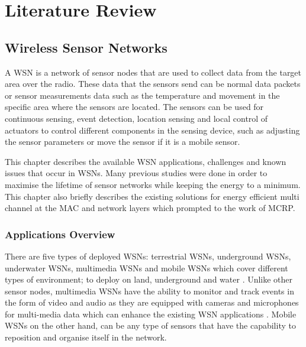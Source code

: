 \chapter{Literature Review}
\label{literatureReview}

\section{Wireless Sensor Networks}
A WSN is a network of sensor nodes that are used to collect data from the target area over the radio. These data that the sensors send can be normal data packets or sensor measurements data such as the temperature and movement in the specific area where the sensors are located. The sensors can be used for continuous sensing, event detection, location sensing and local control of actuators to control different components in the sensing device, such as adjusting the sensor parameters or move the sensor if it is a mobile sensor.


This chapter describes the available WSN applications, challenges and known issues that occur in WSNs. Many previous studies were done in order to maximise the lifetime of sensor networks while keeping the energy to a minimum. This chapter also briefly describes the existing solutions for energy efficient multi channel at the MAC and network layers which prompted to the work of MCRP. 

\subsection{Applications Overview}
There are five types of deployed WSNs: terrestrial WSNs, underground WSNs, underwater WSNs, multimedia WSNs and mobile WSNs which cover different types of environment; to deploy on land, underground and water \cite{wsnSurvey1}. Unlike other sensor nodes, multimedia WSNs have the ability to monitor and track events in the form of video and audio as they are equipped with cameras and microphones for multi-media data which can enhance the existing WSN applications \cite{wsnSurvey3}. Mobile WSNs on the other hand, can be any type of sensors that have the capability to reposition and organise itself in the network.
 
